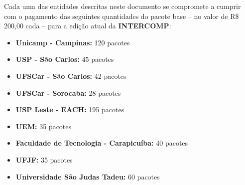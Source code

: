 \begin{article}
	\label{art:cotas}
	Cada uma das entidades descritas neste documento se compromete a cumprir com o pagamento das seguintes quantidades do pacote base -- no valor de R\$ 200,00 cada -- para a edição atual da \textbf{INTERCOMP}:
	\begin{itemize}[noitemsep]
		\item \textbf{Unicamp - Campinas:} 120 pacotes
		\item \textbf{USP - São Carlos:} 45 pacotes
		\item \textbf{UFSCar - São Carlos:} 42 pacotes
		\item \textbf{UFSCar - Sorocaba:} 28 pacotes
		\item \textbf{USP Leste - EACH:} 195 pacotes
		\item \textbf{UEM:} 35 pacotes
		\item \textbf{Faculdade de Tecnologia - Carapicuíba:} 40 pacotes
		\item \textbf{UFJF:} 35 pacotes
		\item \textbf{Universidade São Judas Tadeu:} 60 pacotes
	\end{itemize}
\end{article}
